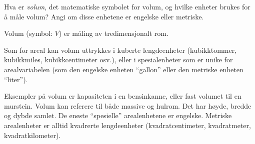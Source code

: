

Hva er {\it volum}, det matematiske symbolet for volum, og hvilke enheter brukes for å måle volum?  Angi om disse enhetene er engelske eller metriske.







Volum (symbol: $V$) er måling av tredimensjonalt rom.

\vskip 10pt

Som for areal kan volum uttrykkes i kuberte lengdeenheter (kubikktommer, kubikkmiles, kubikkcentimeter osv.), eller i spesialenheter som er unike for arealvariabelen (som den engelske enheten ``gallon'' eller den metriske enheten ``liter'').







Eksempler på volum er kapasiteten i en bensinkanne, eller fast volumet til en murstein.  Volum kan referere til både massive og hulrom.  Det har høyde, bredde og dybde samlet.
De eneste ``spesielle'' arealenhetene er engelske.  Metriske arealenheter er alltid kvadrerte lengdeenheter (kvadratcentimeter, kvadratmeter, kvadratkilometer).


